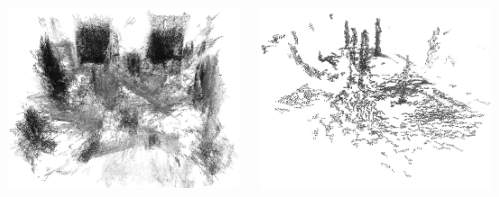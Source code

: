 \documentclass[28pt, a4paper, landscape]{tikzposter}
\begin{document}
\begin{columns}
{\begin{minipage}[t]{0.24\linewidth}
\begin{tikzfigure}
\end{tikzfigure}
\end{minipage}
\hfill
\begin{minipage}[t]{0.24\linewidth}
\begin{tikzfigure}
  \centering
  \includegraphics[width=\linewidth]{../img/euroc_v2_02.png}
\end{tikzfigure}
\end{minipage}
\hfill
\begin{minipage}[t]{0.24\linewidth}
\begin{tikzfigure}
  \centering
  \includegraphics[width=\linewidth]{../img/aau_fc_dnav5_top.png}
\end{tikzfigure}
\end{minipage}

}
\end{columns}
\end{document}
